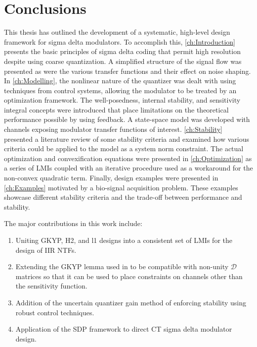 
\chapter{Conclusions}
\label{ch:Conclusions}

This thesis has outlined the development of a systematic, high-level design framework for sigma delta modulators. To accomplish this, \autoref{ch:Introduction} presents the basic principles of sigma delta coding that permit high resolution despite using coarse quantization. A simplified structure of the signal flow was presented as were the various transfer functions and their effect on noise shaping. In \autoref{ch:Modelling}, the nonlinear nature of the quantizer was dealt with using techniques from control systems, allowing the modulator to be treated by an optimization framework. The well-posedness, internal stability, and sensitivity integral concepts were introduced that place limitations on the theoretical performance possible by using feedback. A state-space model was developed with channels exposing modulator transfer functions of interest. \autoref{ch:Stability} presented a literature review of some stability criteria and examined how various criteria could be applied to the model as a system norm constraint. The actual optimization and convexification equations were presented in \autoref{ch:Optimization} as a series of \gls{LMI}s coupled with an iterative procedure used as a workaround for the non-convex quadratic term. Finally, design examples were presented in \autoref{ch:Examples} motivated by a bio-signal acquisition problem. These examples showcase different stability criteria and the trade-off between performance and stability.

The major contributions in this work include:

\begin{enumerate}
	\item Uniting \gls{GKYP}, \gls{H2}, and \gls{l1} designs into a consistent set of \gls{LMI}s for the design of \gls{IIR} \gls{NTF}s.
	\item Extending the \gls{GKYP} lemma used in \cite{Li2014} to be compatible with non-unity $\mathcal{D}$ matrices so that it can be used to place constraints on channels other than the sensitivity function.
	\item Addition of the uncertain quantizer gain method of enforcing stability using robust control techniques.
	\item Application of the \gls{SDP} framework to direct \gls{CT} sigma delta modulator design.
\end{enumerate}

